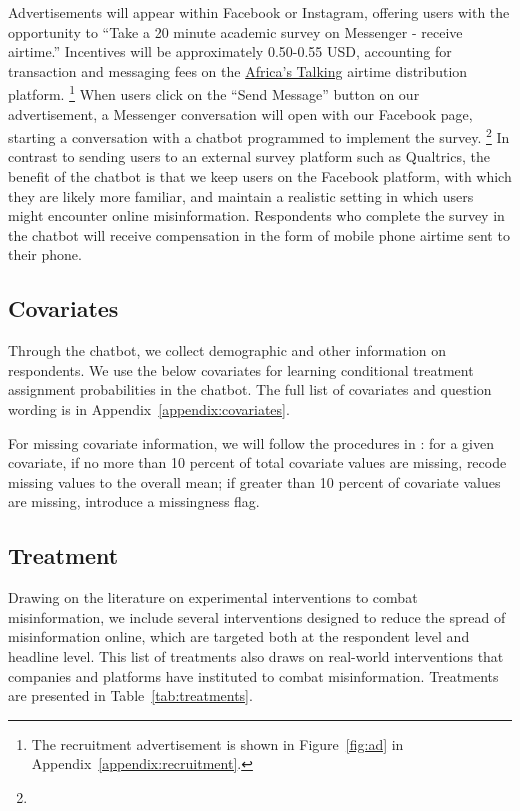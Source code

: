 \documentclass[letterpaper, 12pt, parskip=full,]{scrartcl}
\begin{document}
Advertisements will appear within Facebook or Instagram, offering users with the opportunity to ``Take a 20 minute academic survey on Messenger - receive airtime.'' Incentives will be approximately 0.50-0.55 USD, accounting for transaction and messaging fees on the \href{https://africastalking.com/}{Africa's Talking} airtime distribution platform.%
\footnote{The recruitment advertisement is shown in Figure~\ref{fig:ad} in Appendix~\ref{appendix:recruitment}.} %
 When users click on the ``Send Message'' button on our advertisement, a Messenger conversation will open with our Facebook page, starting a conversation with a chatbot programmed to implement the survey.%
 \footnote{\color{red}{[[TK: images of chatbot once linked to page]]}} %
 In contrast to sending users to an external survey platform such as Qualtrics, the benefit of the chatbot is that we keep users on the Facebook platform, with which they are likely more familiar, and maintain a realistic setting in which users might encounter online misinformation.  Respondents who complete the survey in the chatbot will receive compensation in the form of mobile phone airtime sent to their phone. %


\subsection{Covariates}
Through the chatbot, we collect demographic and other information on respondents.  We use the below covariates for learning conditional treatment assignment probabilities in the chatbot. The full list of covariates and question wording is in Appendix~\ref{appendix:covariates}. %



For missing covariate information, we will follow the procedures in \cite{greensop1.05}: for a given covariate, if no more than 10 percent of total covariate values are missing, recode missing values to the overall mean; if greater than 10 percent of covariate values are missing, introduce a missingness flag. 

\subsection{Treatment}
Drawing on the literature on experimental interventions to combat misinformation, we include several interventions designed to reduce the spread of misinformation online, which are targeted both at the respondent level and headline level. This list of treatments also draws on real-world interventions that companies and platforms have instituted to combat misinformation. Treatments are presented in Table~\ref{tab:treatments}. 
\end{document}

